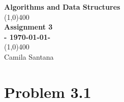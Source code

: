 \documentclass[11pt]{article}
\begin{document}
\begin{titlepage}
	\begin{center}

	\vspace*{1cm}
		\Large{\textbf{Algorithms and Data Structures}}\\
		\vfill
		\line(1,0){400}\\ [3mm]
		\Huge{\textbf{Assignment 3}}\\ [3mm]
		\Large{\textbf{- \today -}}\\ [1mm]
		\line(1,0){400}\\
		\vfill
		Camila Santana \\
		
	\end{center}
\end{titlepage}

\section{Problem 3.1}
\end{document}
